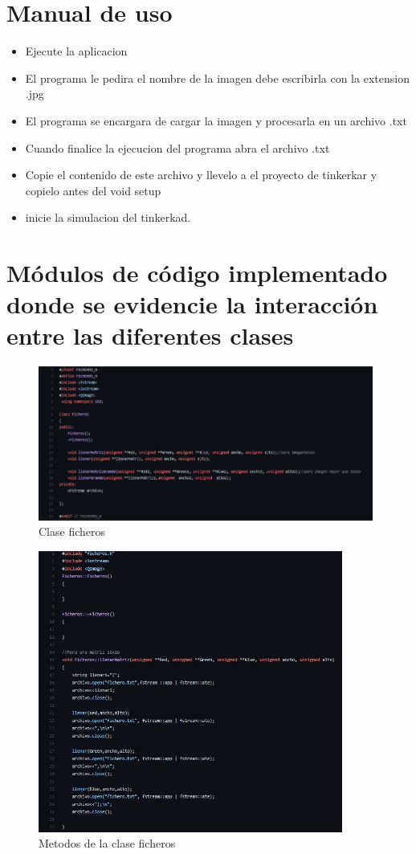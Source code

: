 \documentclass{article}
\begin{document}
\section{ Manual de uso}
\begin{itemize}
    \item Ejecute la aplicacion
    \item El programa le pedira el nombre de la imagen debe escribirla con la extension .jpg
    \item El programa se encargara de cargar la imagen y procesarla en un archivo .txt
    \item Cuando finalice la ejecucion del programa abra el archivo .txt
    \item Copie el contenido de este archivo y llevelo a el proyecto de tinkerkar y copielo antes del void setup
    \item inicie la simulacion del tinkerkad.
\end{itemize}


\section{Módulos de código implementado donde se evidencie la interacción entre las
diferentes clases} 

\begin{figure}[ht]
\includegraphics[width=11cm]{Imagenes/Clase ficheros.png}
\centering
\caption{Clase ficheros}
\label{fig:Clase ficheros}
\end{figure}

\begin{figure}[ht]
\includegraphics[width=10cm]{Imagenes/Metodos de la clase ficheros.png}
\centering
\caption{Metodos de la clase ficheros}
\label{fig:Metodos de la clase fichero }
\end{figure}
\end{document}
